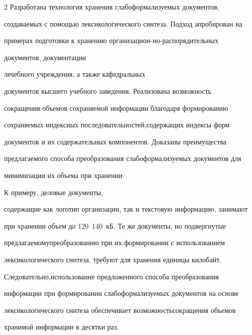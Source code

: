 \begin{multicols}{2}
     Разработана технология хранения слабоформализуемых документов, 


создаваемых с помощью лексикологического синтеза. Подход апробирован на\linebreak 


примерах подготовки к хранению организацион-\linebreak но-распорядительных 


документов, документации\linebreak


лечебного учреждения, а также кафедральных\linebreak 


документов высшего учебного заведения. Реализована возможность 


сокращения объемов со\-хра\-ня\-емой информации благодаря формированию\linebreak 


со\-хра\-ня\-емых индексных последовательностей,\linebreak содержащих индексы форм 


документов и их содержательных компонентов. Доказаны преиму\-щества 


предлагаемого способа преобразования сла\-бо\-фор\-ма\-ли\-зу\-емых документов для 


минимизации их \mbox{объема} при хранении. 





К примеру, деловые документы, 


содержащие как логотип организации, так и текстовую информацию, занимают 


при хранении объем до 120--140~кБ. Те же документы, но подвергнутые 


предлагаемому\linebreak преобразованию при их формировании с использованием 


лексикологического синтеза, требуют для хранения единицы килобайт. 


Следовательно,\linebreak использование предложенного способа преобра\-зования 


информации при формировании сла\-бо\-формализуемых документов на основе 


лексикологического синтеза обеспечивает возможность\linebreak сокращения объемов 


хранимой информации в десятки раз. 






\end{multicols}
